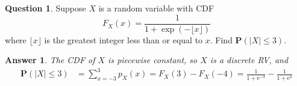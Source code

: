 \documentclass[utf8]{article}
\theoremstyle{definition}%
\newtheorem{question}{Question} %
\theoremstyle{plain}%
\newtheorem{answer}{Answer} %
\begin{document}
\begin{question}
    Suppose $X$ is a random variable with CDF
    \begin{equation}
        F_{X}(x) = \frac{1}{1 + \exp(-\lfloor x \rfloor)}
    \end{equation}
    where $\lfloor x \rfloor$ is the greatest integer less than or equal to $x$. Find $\mathbf{P}(|X| \leq 3)$.
\end{question}
\begin{answer}
    The CDF of $X$ is piecewise constant, so $X$ is a discrete RV, and 
    \begin{equation}
    \begin{aligned}
        \mathbf{P}(|X| \leq 3) &= \sum_{x=-3}^{3}p_{X}(x) = F_{X}(3) - F_{X}(-4) = \frac{1}{1 + \mathrm{e}^{-3}} - \frac{1}{1 + \mathrm{e}^{4}}
    \end{aligned}
    \end{equation}
\end{answer}
\end{document}
